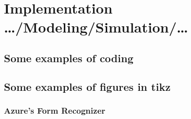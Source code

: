 








\section{Implementation …/Modeling/Simulation/…}
\label{sec:implementationDetails}


\subsection{Some examples of coding}




\subsection{Some examples of figures in tikz}




\subsubsection{Azure's Form Recognizer}


\cleardoublepage